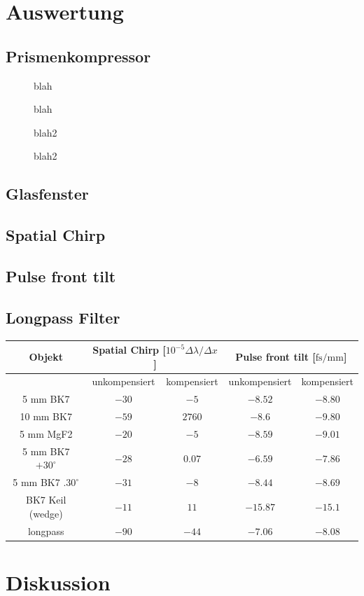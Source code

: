 \documentclass[twoside,        %
               BCOR12mm,       %
               english,ngerman, %
               fleqn,headsepline=false,footsepline=false
              ]{Vorlage/MFPREPORT}
\begin{document}
\section{Auswertung}
\label{sec:auswertung}
\subsection{Prismenkompressor}


\begin{figure}[]
    \centering
    
    \caption{blah}
    \label{fig:temp1}
\end{figure}
\begin{figure}[]
    \centering
    
    \caption{blah}
    \label{fig:spec1}
\end{figure}
\begin{figure}[]
    \centering
    
    \caption{blah2}
    \label{fig:temp2}
\end{figure}
\begin{figure}[]
    \centering
    
    \caption{blah2}
    \label{fig:spec2}
\end{figure}
\subsection{Glasfenster}
\subsection{Spatial Chirp}
\subsection{Pulse front tilt}
\subsection{Longpass Filter}
\begin{table}
    \centering
    \begin{tabular}[]{|c||c|c||c|c|}
        \hline
        Objekt&\multicolumn{2}{|c||}{Spatial Chirp [$10^{-5}\Delta\lambda/\Delta x$]}&\multicolumn{2}{|c|}{Pulse front tilt [$\text{fs}/\text{mm}$]}\\\hline
         &unkompensiert&kompensiert&unkompensiert&kompensiert\\ 
        \hline
        5 mm BK7&$-30$&$-5$&$-8.52$&$-8.80$\\\hline
        10 mm BK7&$-59$&$2760$&$-8.6$&$-9.80$\\\hline
        5 mm MgF2&$-20$&$-5$&$-8.59$&$-9.01$\\\hline
        5 mm BK7 $+30^\circ$&$-28$&$0.07$&$-6.59$&$-7.86$\\\hline
        5 mm BK7 $.30^\circ$&$-31$&$-8$&$-8.44$&$-8.69$\\\hline
        BK7 Keil (wedge)&$-11$&$11$&$-15.87$&$-15.1$\\\hline
        longpass&$-90$&$-44$&$-7.06$&$-8.08$\\\hline
    \end{tabular}
\end{table}
\section{Diskussion}
\cite{tidecks1990current}



\end{document}
